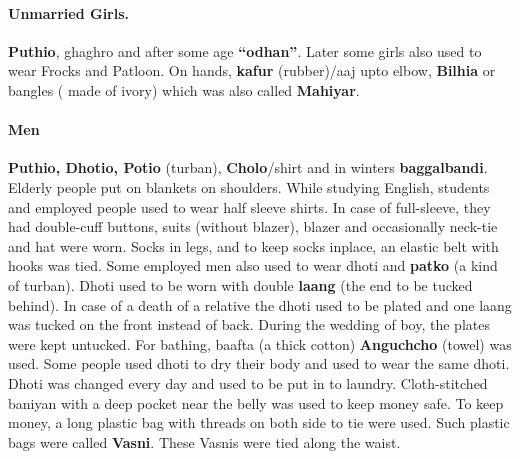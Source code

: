 \paragraph{Unmarried Girls.} \textbf{Puthio}, ghaghro and after some age
\textbf{``odhan''}. Later some girls also used to wear Frocks and Patloon. On hands,
\textbf{kafur} (rubber)/aaj upto elbow, \textbf{Bilhia} or bangles ( made of
ivory) which was also called \textbf{Mahiyar}.
\paragraph{Men} \textbf{Puthio, Dhotio, Potio} (turban), \textbf{Cholo}/shirt
and in winters \textbf{baggalbandi}. Elderly people put on blankets on
shoulders. While studying English, students and employed people used to wear
half sleeve shirts. In case of full-sleeve, they had double-cuff buttons, suits
(without blazer), blazer and occasionally neck-tie and hat were worn. Socks in
legs, and to keep socks inplace, an elastic belt with hooks was tied. Some
employed men also used to wear dhoti and \textbf{patko} (a kind of turban).
Dhoti used to be worn with double \textbf{laang} (the end to be tucked behind).
In case of a death of a relative the dhoti used to be plated and one laang was
tucked on the front instead of back. During the wedding of boy, the plates
were kept untucked.
For bathing, baafta (a thick cotton) \textbf{Anguchcho} (towel) was used. Some
people used dhoti to dry their body and used to wear the same dhoti. Dhoti was
changed every day and used to be put in to laundry. Cloth-stitched baniyan with
a deep pocket near the belly was used to keep money safe. To keep money, a long
plastic bag with threads on both side to tie were used. Such plastic bags were
called \textbf{Vasni}. These Vasnis were tied along the waist.
